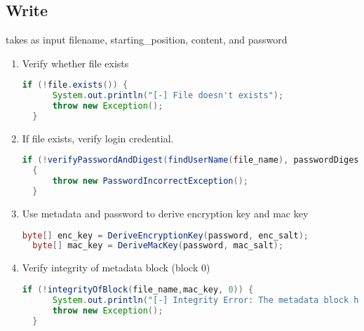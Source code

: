 \documentclass[a4paper,10pt]{article}
\begin{document}
\subsection{Write} %
\label{sub:write}
takes as input filename, starting\_position, content, and password 
\begin{enumerate}
  \item Verify whether file exists
  \begin{lstlisting}[linewidth=.5\columnwidth,breaklines=true,language=Java]
  if (!file.exists()) {
      System.out.println("[-] File doesn't exists");
      throw new Exception();
  }\end{lstlisting}
  \item If file exists, verify login credential.
  \begin{lstlisting}[linewidth=\columnwidth,breaklines=true,language=Java]
  if (!verifyPasswordAndDigest(findUserName(file_name), passwordDigest, passwd_salt, password))
  {
      throw new PasswordIncorrectException();    
  }\end{lstlisting}

  \item Use metadata and password to derive encryption key and mac key
  \begin{lstlisting}[linewidth=.5\columnwidth,breaklines=true,language=Java]
  byte[] enc_key = DeriveEncryptionKey(password, enc_salt);
  byte[] mac_key = DeriveMacKey(password, mac_salt);\end{lstlisting}
  
  \item Verify integrity of metadata block (block 0)
  \begin{lstlisting}[linewidth=\columnwidth,breaklines=true,language=Java]
  if (!integrityOfBlock(file_name,mac_key, 0)) {
      System.out.println("[-] Integrity Error: The metadata block has been modified");
      throw new Exception();
  }\end{lstlisting}
  

\end{enumerate}
\end{document}
